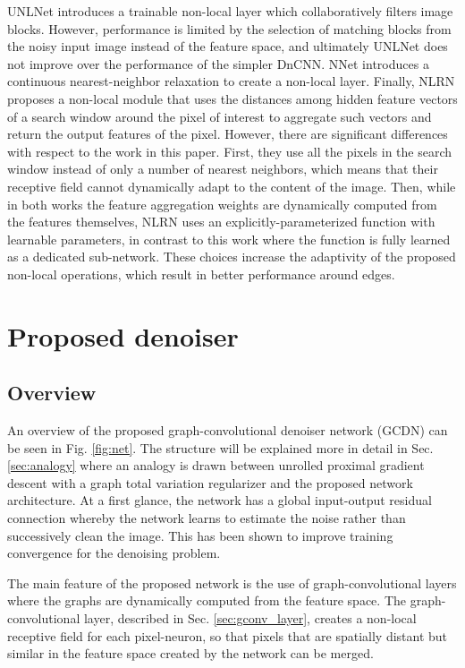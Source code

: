 \documentclass[journal]{IEEEtran}
\begin{document}
UNLNet \cite{lefkimmiatis2018universal} introduces a trainable non-local layer which collaboratively filters image blocks. However, performance is limited by the selection of matching blocks from the noisy input image instead of the feature space, and ultimately UNLNet does not improve over the performance of the simpler DnCNN. NNet \cite{plotz2018neural} introduces a continuous nearest-neighbor relaxation to create a non-local layer. Finally, NLRN \cite{liu2018non} proposes a non-local module that uses the distances among hidden feature vectors of a search window around the pixel of interest to aggregate such vectors and return the output features of the pixel. However, there are significant differences with respect to the work in this paper. First, they use all the pixels in the search window instead of only a number of nearest neighbors, which means that their receptive field cannot dynamically adapt to the content of the image. Then, while in both works the feature aggregation weights are dynamically computed from the features themselves, NLRN uses an explicitly-parameterized function with learnable parameters, in contrast to this work where the function is fully learned as a dedicated sub-network. These choices increase the adaptivity of the proposed non-local operations, which result in better performance around edges.


\section{Proposed denoiser}\label{sec:method}


\subsection{Overview} \label{sec:overview}

An overview of the proposed graph-convolutional denoiser network (GCDN) can be seen in Fig. \ref{fig:net}. The structure will be explained more in detail in Sec. \ref{sec:analogy} where an analogy is drawn between unrolled proximal gradient descent with a graph total variation regularizer and the proposed network architecture. At a first glance, the network has a global input-output residual connection whereby the network learns to estimate the noise rather than successively clean the image. This has been shown \cite{zhang2017beyond} to improve training convergence for the denoising problem. 

The main feature of the proposed network is the use of graph-convolutional layers where the graphs are dynamically computed from the feature space. The graph-convolutional layer, described in Sec. \ref{sec:gconv_layer}, creates a non-local receptive field for each pixel-neuron, so that pixels that are spatially distant but similar in the feature space created by the network can be merged. 
\end{document}
